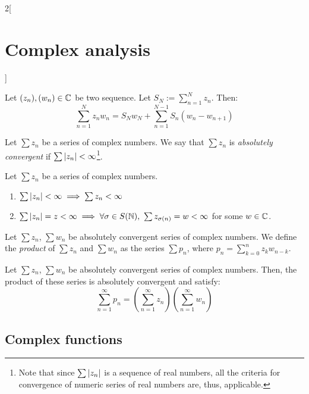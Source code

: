 \documentclass[../../../main.tex]{subfiles}
\begin{document}
\begin{multicols}{2}[\section{Complex analysis}]
\begin{proposition}
\begin{enumerate}
    \end{enumerate}
  \end{proposition}
  \begin{lemma}
    Let $(z_n),(w_n)\in\mathbb{C}$ be two sequence. Let $S_N:=\sum_{n=1}^N z_n$. Then:
    \begin{equation*}
      \sum_{n=1}^N z_nw_n=S_Nw_N+\sum_{n=1}^{N-1}S_n(w_n-w_{n+1})
    \end{equation*}
  \end{lemma}
  \begin{definition}
    Let $\sum z_n$ be a series of complex numbers. We say that $\sum z_n$ is \emph{absolutely convergent} if $\sum \abs{z_n}<\infty$\footnote{Note that since $\sum \abs{z_n}$ is a sequence of real numbers, all the criteria for convergence of numeric series of real numbers are, thus, applicable.}.
  \end{definition}
  \begin{proposition}
    Let $\sum z_n$ be a series of complex numbers.
    \begin{enumerate}
      \item $\sum \abs{z_n}<\infty\implies\sum z_n<\infty$
      \item $\sum \abs{z_n}=z<\infty\implies\forall\sigma\in S(\mathbb{N}),\ \sum z_{\sigma (n)}=w<\infty$ for some $w\in\mathbb{C}$.
    \end{enumerate}
  \end{proposition}
  \begin{definition}
    Let $\sum z_n$, $\sum w_n$ be absolutely convergent series of complex numbers. We define the \emph{product} of $\sum z_n$ and $\sum w_n$ as the series $\sum p_n$, where $p_n=\sum_{k=0}^nz_kw_{n-k}$.
  \end{definition}
  \begin{proposition}
    Let $\sum z_n$, $\sum w_n$ be absolutely convergent series of complex numbers. Then, the product of these series is absolutely convergent and satisfy: $$\sum_{n=1}^\infty p_n=\left(\sum_{n=1}^\infty z_n\right)\left(\sum_{n=1}^\infty w_n\right)$$
  \end{proposition}
  \subsection{Complex functions}

\end{multicols}
\end{document}
